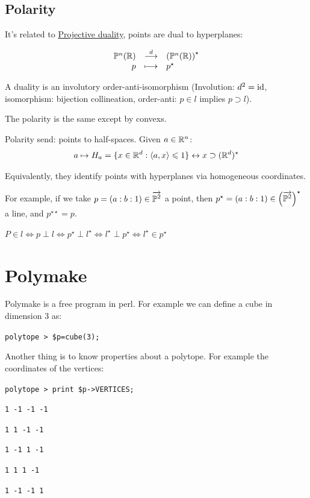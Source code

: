 \subsection{Polarity}

It's related to \underline{Projective duality}, points are dual to hyperplanes:

$$\begin{array}{rcl}
    \mathbb{P}^n(\mathbb{R})	&\stackrel{d}{\longrightarrow}	&\left(\mathbb{P}^n(\mathbb{R})\right)^{\star}\\
    p			&\longmapsto				&p^{\star}
  \end{array}$$

A duality is an involutory order-anti-isomorphism (Involution: $d^2=\operatorname{id}$, isomorphism: bijection collineation, order-anti: $p\in l$ implies $p\supset l$).

The polarity is the same except by convexs.

Polarity send: points to half-spaces. Given $a\in \mathbb{R}^n$:
$$a\mapsto H_a=\{x\in\mathbb{R}^d:\langle a,x\rangle\leqslant 1\}\leftrightarrow x\supset (\mathbb{R}^d)^{\star}$$

Equivalently, they identify points with hyperplanes via homogeneous coordinates.

For example, if we take $p=(a:b:1)\in \overrightarrow{\mathbb{P}^2}$ a point, then $p^{\star}=(a:b:1)\in \left(\overrightarrow{\mathbb{P}^2}\right)^{\star}$ a line, and $p^{\star\star}=p$.

$P\in l\Leftrightarrow p\perp l\Leftrightarrow p^{\star}\perp l^{\star}\Leftrightarrow l^{\star}\perp p^{\star}\Leftrightarrow l^{\star}\in p^{\star}$ 

\section{Polymake}

Polymake is a free program in perl. For example we can define a cube in dimension 3 as:

\texttt{polytope > \$p=cube(3);}

Another thing is to know properties about a polytope. For example the coordinates of the vertices:

\texttt{polytope > print \$p->VERTICES;}

\texttt{1 -1 -1 -1}

\texttt{1 1 -1 -1}

\texttt{1 -1 1 -1}

\texttt{1 1 1 -1}

\texttt{1 -1 -1 1}

